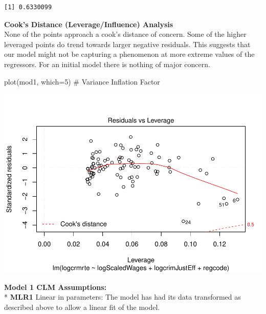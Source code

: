 \documentclass[]{article}
\newenvironment{Shaded}{}{}
\newcommand{\CommentTok}[1]{\textcolor[rgb]{0.00,0.50,0.00}{#1}}
\newcommand{\DataTypeTok}[1]{#1}
\newcommand{\DecValTok}[1]{#1}
\newcommand{\KeywordTok}[1]{\textcolor[rgb]{0.00,0.00,1.00}{#1}}
\newcommand{\NormalTok}[1]{#1}
\newcommand{\OperatorTok}[1]{#1}
\begin{document}
\begin{Shaded}
\end{Shaded}

\begin{verbatim}
[1] 0.6330099
\end{verbatim}

\textbf{Cook's Distance (Leverage/Influence) Analysis}\\
None of the points approach a cook's distance of concern. Some of the
higher leveraged points do trend towards larger negative residuals. This
suggests that our model might not be capturing a phenomenon at more
extreme values of the regressors. For an initial model there is nothing
of major concern.

\begin{Shaded}
\begin{Highlighting}[]
\KeywordTok{plot}\NormalTok{(mod1, }\DataTypeTok{which=}\DecValTok{5}\NormalTok{) }\CommentTok{# Variance Inflation Factor}
\end{Highlighting}
\end{Shaded}

\includegraphics{Bagnard_Gaustad_Hartman_Leung_Lab_3_files/figure-latex/unnamed-chunk-60-1.pdf}

\textbf{Model 1 CLM Assumptions:}\\
* \textbf{MLR1} Linear in parameters: The model has had its data
transformed as described above to allow a linear fit of the model.
\end{document}
